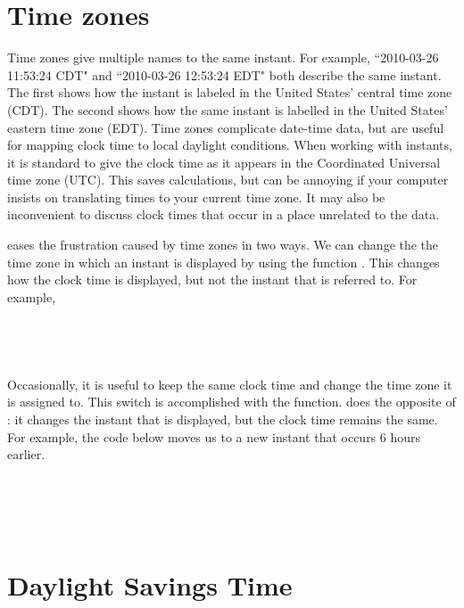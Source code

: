 \documentclass[article]{jss}
\begin{document}
\section{Time zones}
\label{sec:tz}

Time zones give multiple names to the same instant. For example, ``2010-03-26 11:53:24 CDT" and ``2010-03-26 12:53:24 EDT" both describe the same instant. The first shows how the instant is labeled in the United States' central time zone (CDT). The second shows how the same instant is labelled in the United States' eastern time zone (EDT). Time zones complicate date-time data, but are useful for mapping clock time to local daylight conditions. When working with instants, it is standard to give the clock time as it appears in the Coordinated Universal time zone (UTC).  This saves calculations, but can be annoying if your computer insists on translating times to your current time zone.  It may also be inconvenient to discuss clock times that occur in a place unrelated to the data.

 eases the frustration caused by time zones in two ways. We can change the the time zone in which an instant is displayed by using the function . This changes how the clock time is displayed, but not the instant that is referred to. For example,\\

\\
\\
\\
\\

Occasionally, it is useful to keep the same clock time and change the time zone it is assigned to. This switch is accomplished with the  function.  does the opposite of : it changes the instant that is displayed, but the clock time remains the same. For example, the code below moves us to a new instant that occurs 6 hours earlier.\\

\\
\\
\\
\\


\section{Daylight Savings Time}
\label{sec:DST}
\end{document}
